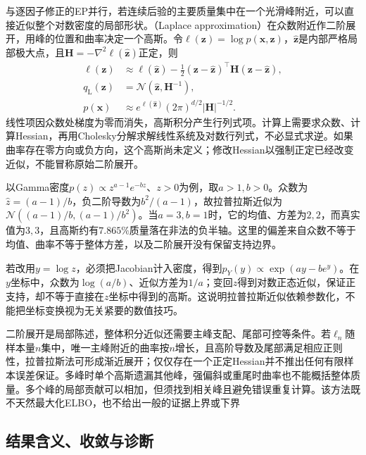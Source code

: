 \label{sec:pgm-variational-laplace}

与逐因子修正的EP并行，若连续后验的主要质量集中在一个光滑峰附近，可以直接近似整个对数密度的局部形状。（Laplace approximation）在众数附近作二阶展开，用峰的位置和曲率决定一个高斯。令$\ell(\bm z)=\log p(\bm x,\bm z)$，$\widehat{\bm z}$是内部严格局部极大点，且$\bm H=-\nabla^2\ell(\widehat{\bm z})$正定，则
\begin{equation}
  \begin{aligned}
    \ell(\bm z)&\approx\ell(\widehat{\bm z})
       -\frac12(\bm z-\widehat{\bm z})^\top
                  \bm H(\bm z-\widehat{\bm z}),\\
    q_{\mathrm L}(\bm z)&=\mathcal N(\widehat{\bm z},\bm H^{-1}),\\
    p(\bm x)&\approx
       e^{\ell(\widehat{\bm z})}(2\pi)^{d/2}|\bm H|^{-1/2}.
  \end{aligned}
  \label{eq:pgm-variational-laplace}
\end{equation}
线性项因众数处梯度为零而消失，高斯积分产生行列式项。计算上需要求众数、计算Hessian，再用Cholesky分解求解线性系统及对数行列式，不必显式求逆。如果曲率存在零方向或负方向，这个高斯尚未定义；修改Hessian以强制正定已经改变近似，不能冒称原始二阶展开。

以Gamma密度$p(z)\propto z^{a-1}e^{-bz}$、$z>0$为例，取$a>1,b>0$。众数为$\widehat z=(a-1)/b$，负二阶导数为$b^2/(a-1)$，故拉普拉斯近似为$\mathcal N((a-1)/b,(a-1)/b^2)$。当$a=3,b=1$时，它的均值、方差为$2,2$，而真实值为$3,3$，且高斯约有$7.865\%$质量落在非法的负半轴。这里的偏差来自众数不等于均值、曲率不等于整体方差，以及二阶展开没有保留支持边界。

若改用$y=\log z$，必须把Jacobian计入密度，得到$p_Y(y)\propto\exp(ay-be^y)$。在$y$坐标中，众数为$\log(a/b)$、近似方差为$1/a$；变回$z$得到对数正态近似，保证正支持，却不等于直接在$z$坐标中得到的高斯。这说明拉普拉斯近似依赖参数化，不能把坐标变换视为无关紧要的数值技巧。

二阶展开是局部陈述，整体积分近似还需要主峰支配、尾部可控等条件。若$\ell_n$随样本量$n$集中，唯一主峰附近的曲率按$n$增长，且高阶导数及尾部满足相应正则性，拉普拉斯法可形成渐近展开；仅仅存在一个正定Hessian并不推出任何有限样本误差保证。多峰时单个高斯遗漏其他峰，强偏斜或重尾时曲率也不能概括整体质量。多个峰的局部贡献可以相加，但须找到相关峰且避免错误重复计算。该方法既不天然最大化ELBO，也不给出一般的证据上界或下界

\subsection{结果含义、收敛与诊断}
\label{sec:pgm-variational-results-diagnostics}
\label{sec:pgm-variational-analysis}
\label{sec:pgm-variational-convergence}
\label{sec:pgm-variational-complexity}
\label{sec:pgm-variational-diagnostics}

